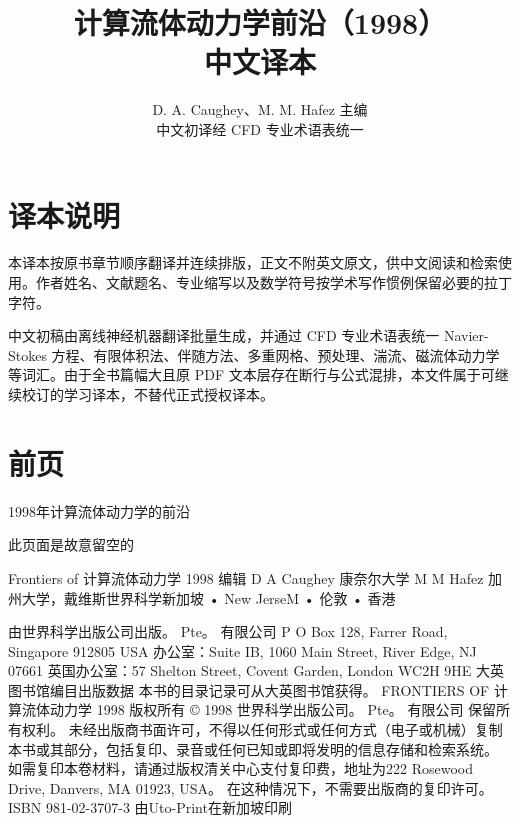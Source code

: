 \documentclass[UTF8,11pt,a4paper,openany,fontset=fandol]{ctexbook}
\title{计算流体动力学前沿（1998）\\[0.45em]\Large 中文译本}
\author{D. A. Caughey、M. M. Hafez 主编\\\small 中文初译经 CFD 专业术语表统一}
\date{}
\begin{document}
\frontmatter
\maketitle
\chapter*{译本说明}
本译本按原书章节顺序翻译并连续排版，正文不附英文原文，供中文阅读和检索使用。作者姓名、文献题名、专业缩写以及数学符号按学术写作惯例保留必要的拉丁字符。

中文初稿由离线神经机器翻译批量生成，并通过 CFD 专业术语表统一 Navier-Stokes 方程、有限体积法、伴随方法、多重网格、预处理、湍流、磁流体动力学等词汇。由于全书篇幅大且原 PDF 文本层存在断行与公式混排，本文件属于可继续校订的学习译本，不替代正式授权译本。
\tableofcontents
\mainmatter
\chapter*{前页}
1998年计算流体动力学的前沿

此页面是故意留空的

Frontiers of 计算流体动力学 1998 编辑 D A Caughey 康奈尔大学 M M Hafez 加州大学，戴维斯世界科学新加坡 • New JerseM • 伦敦 • 香港

由世界科学出版公司出版。 Pte。 有限公司 P O Box 128, Farrer Road, Singapore 912805 USA 办公室：Suite IB, 1060 Main Street, River Edge, NJ 07661 英国办公室：57 Shelton Street, Covent Garden, London WC2H 9HE 大英图书馆编目出版数据 本书的目录记录可从大英图书馆获得。 FRONTIERS OF 计算流体动力学 1998 版权所有 © 1998 世界科学出版公司。 Pte。 有限公司 保留所有权利。 未经出版商书面许可，不得以任何形式或任何方式（电子或机械）复制本书或其部分，包括复印、录音或任何已知或即将发明的信息存储和检索系统。 如需复印本卷材料，请通过版权清关中心支付复印费，地址为222 Rosewood Drive, Danvers, MA 01923, USA。 在这种情况下，不需要出版商的复印许可。 ISBN 981-02-3707-3 由Uto-Print在新加坡印刷
\end{document}
